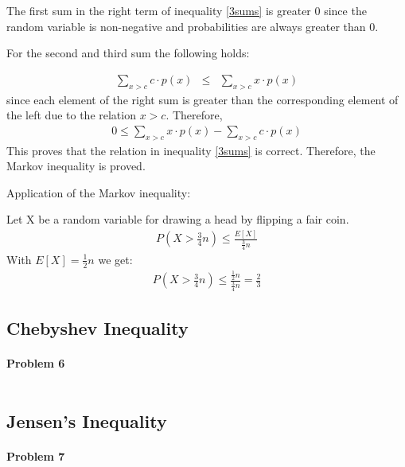 \documentclass{article}
\begin{document}
The first sum in the right term of inequality \ref{3sums} is greater 0 since the random variable is non-negative and probabilities are always greater than 0.

For the second and third sum the following holds:

\begin{eqnarray}
\sum_{x>c}{ c \cdot p(x)} &\leq& \sum_{x>c}{x \cdot p(x)}
\end{eqnarray}
since each element of the right sum is greater than the corresponding element of the left due to the relation $x > c$. Therefore,
\begin{eqnarray}
0 \leq \sum_{x>c}{x \cdot p(x)} - \sum_{x>c}{ c \cdot p(x)}
\end{eqnarray}
This proves that the relation in inequality \ref{3sums} is correct. Therefore, the Markov inequality is proved.

Application of the Markov inequality:

Let X be a random variable for drawing a head by flipping a fair coin.
\begin{eqnarray}
P(X > \frac{3}{4}n) \leq \frac{E[X]}{\frac{3}{4}n}
\end{eqnarray}
With $E[X] = \frac{1}{2}n$ we get:
\begin{eqnarray}
P(X > \frac{3}{4}n) \leq \frac{\frac{1}{2}n}{\frac{3}{4}n} = \frac{2}{3}
\end{eqnarray}


\subsection{Chebyshev Inequality}

\paragraph*{Problem 6}
$\;$ 

\subsection{Jensen's Inequality}

\paragraph*{Problem 7}
$\;$ 
\end{document}
